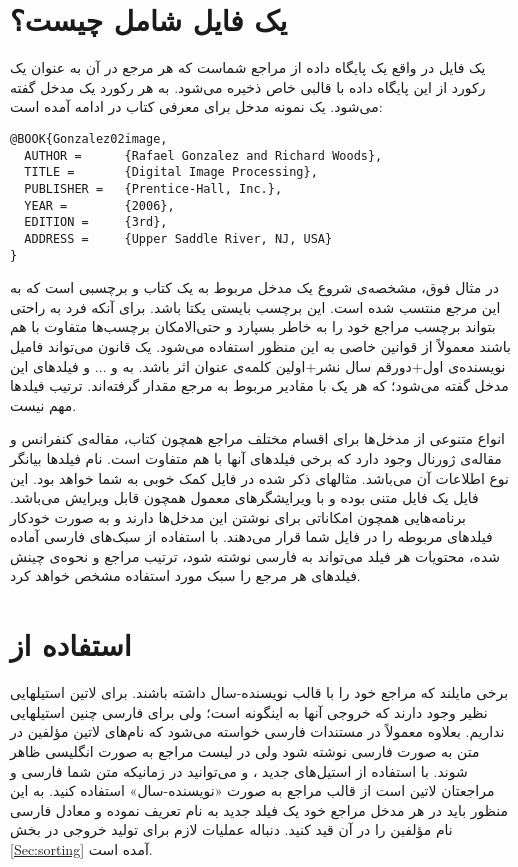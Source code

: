 \documentclass{article}
\theoremstyle{plain}\newtheorem{question}{پرسش}
\begin{document}
\section{یک فایل \texorpdfstring{}{bib} شامل چیست؟}
یک فایل  در واقع یک پایگاه داده از مراجع  شماست که هر مرجع در آن به عنوان یک رکورد از این پایگاه داده
با قالبی خاص ذخیره می‌شود. به هر رکورد یک مدخل گفته می‌شود. یک نمونه مدخل برای معرفی کتاب  در ادامه آمده است:
\begin{LTR}
\begin{verbatim}
@BOOK{Gonzalez02image,
  AUTHOR =      {Rafael Gonzalez and Richard Woods},
  TITLE =       {Digital Image Processing},
  PUBLISHER =   {Prentice-Hall, Inc.},
  YEAR =        {2006},
  EDITION =     {3rd},
  ADDRESS =     {Upper Saddle River, NJ, USA}
}
\end{verbatim}
\end{LTR}
در مثال فوق،  مشخصه‌ی شروع یک مدخل مربوط به یک کتاب و  برچسبی است که به این مرجع منتسب شده است.
 این برچسب بایستی یکتا باشد. برای آنکه فرد به راحتی بتواند برچسب
مراجع خود را به خاطر بسپارد و حتی‌الامکان برچسب‌ها متفاوت با هم باشند معمولاً از قوانین خاصی به این منظور استفاده می‌شود. یک قانون می‌تواند فامیل نویسنده‌ی
اول+دورقم سال نشر+اولین کلمه‌ی عنوان اثر باشد. به  و $\dots$ و  فیلدهای این مدخل گفته می‌شود؛ که هر یک با مقادیر مربوط
به مرجع مقدار گرفته‌اند. ترتیب فیلدها مهم نیست. 

انواع متنوعی از مدخل‌ها برای اقسام مختلف مراجع همچون کتاب، مقاله‌ی کنفرانس و مقاله‌ی ژورنال وجود دارد که برخی فیلدهای آنها با هم متفاوت است. 
نام فیلدها بیانگر نوع اطلاعات آن می‌باشد. مثالهای ذکر شده در فایل  کمک خوبی به شما خواهد بود. 
این فایل یک فایل متنی بوده و با ویرایشگرهای معمول همچون  قابل ویرایش می‌باشد. برنامه‌هایی همچون 
 امکاناتی برای نوشتن این مدخل‌ها دارند و به صورت خودکار فیلدهای مربوطه را در فایل   شما قرار می‌دهند.  
با استفاده از سبک‌های فارسی آماده شده، محتویات هر فیلد می‌تواند به فارسی نوشته شود، ترتیب مراجع و نحوه‌ی چینش فیلدهای هر مرجع را سبک مورد استفاده 
مشخص خواهد کرد.


\section{استفاده از \texorpdfstring{}{natbib}}\label{Sec:natbib}
برخی مایلند که مراجع خود را با قالب نویسنده-سال داشته باشند. برای لاتین استیلهایی نظیر  وجود دارند که خروجی آنها به اینگونه است؛ ولی برای فارسی چنین استیلهایی نداریم. 
بعلاوه معمولاً در مستندات فارسی خواسته می‌شود که نام‌های لاتین مؤلفین در متن به صورت فارسی نوشته شود ولی در لیست مراجع به صورت انگلیسی ظاهر شوند. 
با استفاده از استیل‌های جدید ،   و  می‌توانید در زمانیکه متن شما فارسی و مراجعتان لاتین است از قالب مراجع به صورت «نویسنده-سال» استفاده کنید. به این منظور باید در هر مدخل مراجع خود یک فیلد جدید به نام  تعریف نموده و معادل فارسی نام مؤلفین را در آن قید کنید. 
دنباله عملیات لازم برای تولید خروجی در بخش \ref{Sec:sorting} آمده است.
\end{document}
